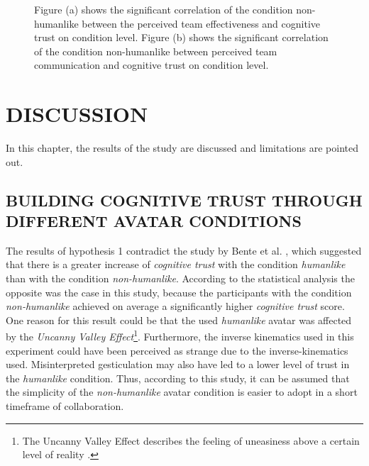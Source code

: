 \documentclass[sigchi]{acmart}
\begin{document}
\begin{figure}[]
  \centering
  \qquad
  \caption[Significant correlations Cognitive trust, Team effectiveness and Team communication]{Figure (a) shows the significant correlation of the condition non-humanlike between the perceived team effectiveness and cognitive trust on condition level. Figure (b) shows the significant correlation of the condition non-humanlike between perceived team communication and cognitive trust on condition level.}
  \label{SubDataCorr}
\end{figure}

\newpage
\section{DISCUSSION}
In this chapter, the results of the study are discussed and limitations are pointed out.

\subsection{BUILDING COGNITIVE TRUST THROUGH DIFFERENT AVATAR CONDITIONS}
The results of hypothesis 1 contradict the study by Bente et al. \citep{bente2004social}, which suggested that there is a greater increase of \textit{cognitive trust} with the condition \textit{humanlike} than with the condition \textit{non-humanlike}. According to the statistical analysis the opposite was the case in this study, because the participants with the condition \textit{non-humanlike} achieved on average a significantly higher \textit{cognitive trust} score.
One reason for this result could be that the used \textit{humanlike} avatar was affected by the \textit{Uncanny Valley Effect}\footnote{The Uncanny Valley Effect describes the feeling of uneasiness above a certain level of reality \citep{gast2011unheimliche}.}.
Furthermore, the inverse kinematics used in this experiment could have been perceived as strange due to the inverse-kinematics used. Misinterpreted gesticulation may also have led to a lower level of trust in the \textit{humanlike} condition. Thus, according to this study, it can be assumed that the simplicity of the \textit{non-humanlike} avatar condition is easier to adopt in a short timeframe of collaboration.
\end{document}
